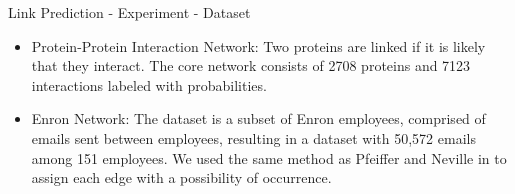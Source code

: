\documentclass[9pt]{beamer}
\begin{document}



\begin{frame}{Link Prediction - Experiment - Dataset}
\begin{itemize}
\item Protein-Protein Interaction Network: Two proteins are linked if it is likely that they interact. The core network consists of 2708 proteins and 7123 interactions labeled with probabilities.

\item Enron Network: The dataset is a subset of Enron employees, comprised of emails sent between employees, resulting in a dataset with 50,572 emails among 151 employees. We used the same method as Pfeiffer and Neville in  \cite{pfeiffer2010probabilistic} to assign each edge with a possibility of occurrence. 

\end{itemize}

\end{frame}
\end{document}
